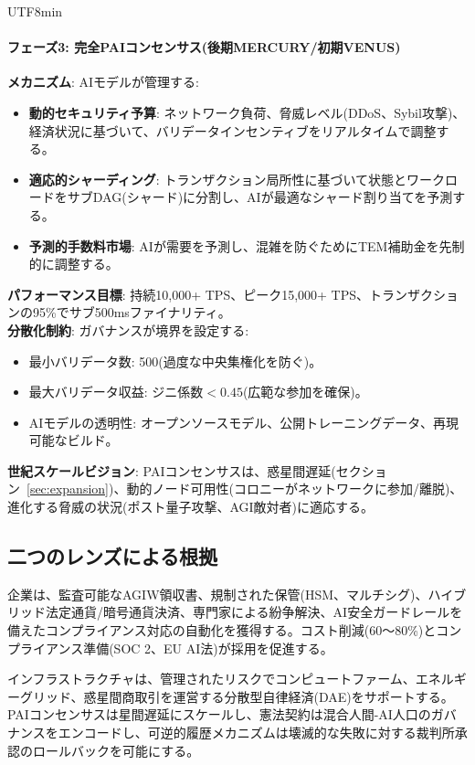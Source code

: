 \documentclass[11pt]{article}
\begin{document}
\begin{CJK}{UTF8}{min}
\paragraph{フェーズ3: 完全PAIコンセンサス(後期MERCURY/初期VENUS)}
\textbf{メカニズム}: AIモデルが管理する:
\begin{itemize}[noitemsep]
  \item \textbf{動的セキュリティ予算}: ネットワーク負荷、脅威レベル(DDoS、Sybil攻撃)、経済状況に基づいて、バリデータインセンティブをリアルタイムで調整する。
  \item \textbf{適応的シャーディング}: トランザクション局所性に基づいて状態とワークロードをサブDAG(シャード)に分割し、AIが最適なシャード割り当てを予測する。
  \item \textbf{予測的手数料市場}: AIが需要を予測し、混雑を防ぐためにTEM補助金を先制的に調整する。
\end{itemize}
\textbf{パフォーマンス目標}: 持続10,000+ TPS、ピーク15,000+ TPS、トランザクションの95\%でサブ500msファイナリティ。\\
\textbf{分散化制約}: ガバナンスが境界を設定する:
\begin{itemize}[noitemsep]
  \item 最小バリデータ数: 500(過度な中央集権化を防ぐ)。
  \item 最大バリデータ収益: ジニ係数$<0.45$(広範な参加を確保)。
  \item AIモデルの透明性: オープンソースモデル、公開トレーニングデータ、再現可能なビルド。
\end{itemize}
\textbf{世紀スケールビジョン}: PAIコンセンサスは、惑星間遅延(セクション~\ref{sec:expansion})、動的ノード可用性(コロニーがネットワークに参加/離脱)、進化する脅威の状況(ポスト量子攻撃、AGI敵対者)に適応する。

\subsection{二つのレンズによる根拠}
\begin{description}[style=nextline]
  \item[短期(MERCURY紀元)] 企業は、監査可能なAGIW領収書、規制された保管(HSM、マルチシグ)、ハイブリッド法定通貨/暗号通貨決済、専門家による紛争解決、AI安全ガードレールを備えたコンプライアンス対応の自動化を獲得する。コスト削減(60〜80\%)とコンプライアンス準備(SOC 2、EU AI法)が採用を促進する。
  \item[世紀スケール(VENUSからANDROMEDA)] インフラストラクチャは、管理されたリスクでコンピュートファーム、エネルギーグリッド、惑星間商取引を運営する分散型自律経済(DAE)をサポートする。PAIコンセンサスは星間遅延にスケールし、憲法契約は混合人間-AI人口のガバナンスをエンコードし、可逆的履歴メカニズムは壊滅的な失敗に対する裁判所承認のロールバックを可能にする。
\end{description}


\end{CJK}
\end{document}

